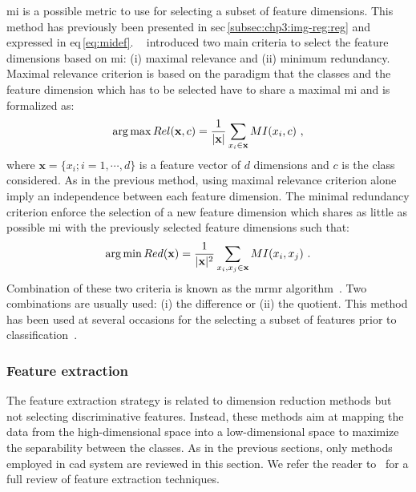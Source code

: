 \Ac{mi} is a possible metric to use for selecting a subset of feature dimensions.
This method has previously been presented in \acs{sec}\,\ref{subsec:chp3:img-reg:reg} and expressed in \acs{eq}\,\eqref{eq:midef}.
\citeauthor{Peng2005}~\cite{Peng2005} introduced two main criteria to select the feature dimensions based on \ac{mi}: (i) maximal relevance and (ii) minimum redundancy.
Maximal relevance criterion is based on the paradigm that the classes and the feature dimension which has to be selected have to share a maximal \ac{mi} and is formalized as:
\begin{equation}
  \operatorname*{arg\,max} Rel(\mathbf{x},c) = \frac{1}{|\mathbf{x}|} \sum_{x_i \in \mathbf{x}} MI(x_i,c)  \ , 
  \label{eq:mRel}
\end{equation}
\noindent where $\mathbf{x} = \{x_i; i=1,\cdots,d\}$ is a feature vector of $d$ dimensions and $c$ is the class considered.
As in the previous method, using maximal relevance criterion alone imply an independence between each feature dimension.
The minimal redundancy criterion enforce the selection of a new feature dimension which shares as little as possible \ac{mi} with the previously selected feature dimensions such that:
\begin{equation}
  \operatorname*{arg\,min} Red(\mathbf{x}) = \frac{1}{|\mathbf{x}|^2} \sum_{x_i,x_j \in \mathbf{x}} MI(x_i,x_j)  \ . 
  \label{eq:mRed}
\end{equation}
Combination of these two criteria is known as the \ac{mrmr} algorithm~\cite{Peng2005}.
Two combinations are usually used: (i) the difference or (ii) the quotient.
This method has been used at several occasions for the selecting a subset of features prior to classification~\cite{Niaf2011,Niaf2012,lehaire2014computer,Viswanath2012,khalvati2015automated,chung2015prostate}.

\subsubsection{Feature extraction}\label{subsubsec:chp3:img-clas:CADX:fea-ext:ext}
The feature extraction strategy is related to dimension reduction methods but not selecting discriminative features.
Instead, these methods aim at mapping the data from the high-dimensional space into a low-dimensional space to maximize the separability between the classes.
As in the previous sections, only methods employed in \ac{cad} system are reviewed in this section.
We refer the reader to~\cite{Fodor2002} for a full review of feature extraction techniques.

